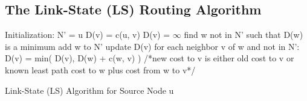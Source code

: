 \documentclass{article}
\begin{document}
\begin{itemize}
\subsection{The Link-State (LS) Routing Algorithm}
\begin{center}
\begin{algorithm}[H]
Initialization:\;
N' = {u}\;
 {
 {
D(v) = c(u, v)\;
}{
D(v) = $\infty$\;
}
}
 {
  find w not in N' such that D(w) is a minimum\;
  add w to N'\;
  update D(v) for each neighbor v of w and not in N': D(v) = min(
  D(v), D(w) + c(w, v) )\;
  /*new cost to v is either old cost to v or known least path cost to
  w plus cost from w to v*/\;
}


\caption{Link-State (LS) Algorithm for Source Node u}
\end{algorithm}
\end{center}
\end{itemize}
\end{document}
